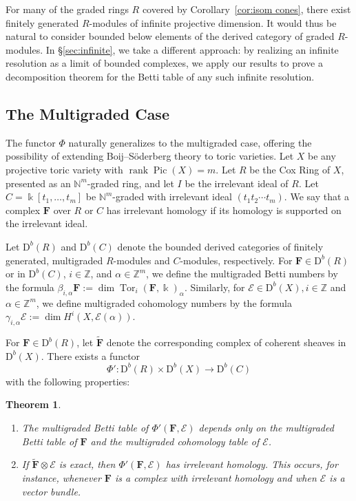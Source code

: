 \documentclass[12pt]{amsart}
\newtheorem{theorem}[lemma]{Theorem}
\theoremstyle{definition}
\theoremstyle{remark}
\newcommand{\Pic}{\operatorname{Pic}}
\newcommand{\Tor}{\operatorname{Tor}}
\newcommand{\kk}{\Bbbk}
\newcommand{\rank}{\operatorname{rank}}
\newcommand{\ZZ}{\mathbb{Z}}
\newcommand{\cE}{\mathcal{E}}
\newcommand{\FF}{\mathbf{F}}
\newcommand{\defi}[1]{\textsf{#1}} %
\newcommand{\DD}{\mathrm{D}}
\begin{document}
For many of the graded rings $R$ covered by Corollary~\ref{cor:isom cones}, there exist finitely generated $R$-modules of infinite projective dimension.  It would thus be natural to consider bounded below elements of the derived category of graded $R$-modules.  In \S\ref{sec:infinite}, we take a different approach: by realizing an infinite resolution as a limit of bounded complexes, we apply our results to prove a decomposition theorem for the Betti table of any such infinite resolution.

\subsection*{The Multigraded Case}
The functor $\Phi$ naturally generalizes to the multigraded case, offering the possibility of extending Boij--S\"oderberg theory to toric varieties.  Let $X$ be any projective toric variety with $\rank \Pic(X)=m$.  Let $R$ be the Cox Ring of $X$, presented as an $\mathbb N^m$-graded ring, and let $I$ be the irrelevant ideal of $R$.  Let $C=\kk[t_1, \dots, t_m]$ be $\mathbb N^m$-graded with irrelevant ideal $(t_1t_2\cdots t_m)$.  We say that a complex $\FF$ over $R$ or $C$ has \defi{irrelevant homology} if its homology is supported on the irrelevant ideal.

Let $\DD^b(R)$ and $\DD^b(C)$ denote the bounded derived categories of finitely generated, multigraded $R$-modules and $C$-modules, respectively.   For $\FF\in \DD^b(R)$ or in $\DD^b(C)$, $i\in \ZZ$, and $\alpha\in \ZZ^m$, we define the multigraded Betti numbers by the formula $\beta_{i,\alpha} \FF:=\dim \Tor_i(\FF,\kk)_{\alpha}$.  Similarly, for $\cE\in \DD^b(X), i\in \ZZ$ and $\alpha\in \ZZ^m$, we define multigraded cohomology numbers by the formula $\gamma_{i,\alpha} \cE:=\dim H^i(X, \cE(\alpha))$.  


For  $\FF\in \DD^b(R)$, let $\widetilde{\FF}$ denote the corresponding complex of coherent sheaves in $\DD^b(X)$.  There exists a functor
\[
\Phi': \DD^b(R)\times \DD^b(X)\to \DD^b(C)
\]
with the following properties:
\begin{theorem}\label{thm:Phimulti}
\begin{enumerate}
	\item\label{thm:Phi':1}  The multigraded Betti table of $\Phi'(\FF,\cE)$ depends only on the multigraded Betti table of $\FF$ and the multigraded cohomology table of $\cE$.
	\item\label{thm:Phi':2}  If $\widetilde{\FF}\otimes \cE$ is exact, then $\Phi'(\FF,\cE)$ has irrelevant homology.  This occurs, for instance, whenever $\FF$ is a complex with irrelevant homology and when $\cE$ is a vector bundle.
\end{enumerate}
\end{theorem}
\end{document}
